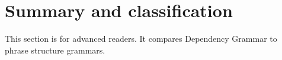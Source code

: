 %
%






\section{Summary and classification}



This section is for advanced readers. It compares Dependency Grammar to phrase structure grammars.

